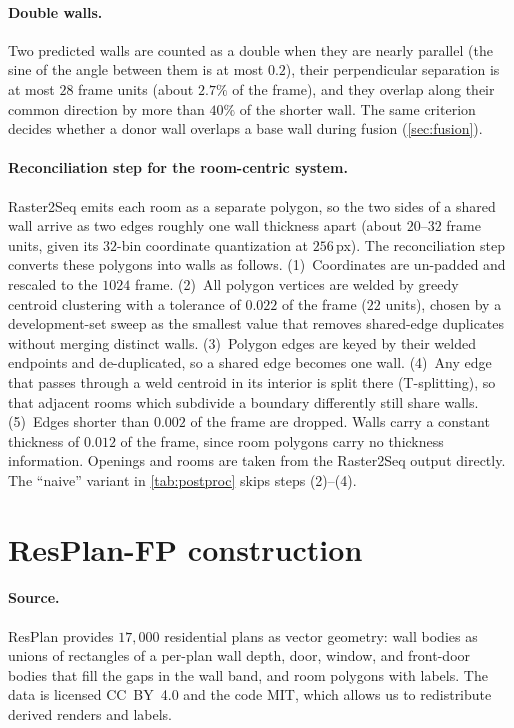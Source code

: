 \documentclass{article}
\begin{document}
\paragraph{Double walls.} Two predicted walls are counted as a double when
they are nearly parallel (the sine of the angle between them is at most
$0.2$), their perpendicular separation is at most $28$ frame units (about
$2.7\%$ of the frame), and they overlap along their common direction by more
than $40\%$ of the shorter wall. The same criterion decides whether a donor
wall overlaps a base wall during fusion (\cref{sec:fusion}).

\paragraph{Reconciliation step for the room-centric system.} Raster2Seq emits
each room as a separate polygon, so the two sides of a shared wall arrive as
two edges roughly one wall thickness apart (about $20$--$32$ frame units,
given its $32$-bin coordinate quantization at $256$\,px). The reconciliation
step converts these polygons into walls as follows. (1)~Coordinates are
un-padded and rescaled to the $1024$ frame. (2)~All polygon vertices are
welded by greedy centroid clustering with a tolerance of $0.022$ of the frame
($22$ units), chosen by a development-set sweep as the smallest
value that removes shared-edge duplicates without merging distinct walls.
(3)~Polygon edges are keyed by their welded endpoints and de-duplicated, so a
shared edge becomes one wall. (4)~Any edge that passes through a weld centroid
in its interior is split there (T-splitting), so that adjacent rooms which
subdivide a boundary differently still share walls. (5)~Edges shorter than
$0.002$ of the frame are dropped. Walls carry a constant thickness of $0.012$
of the frame, since room polygons carry no thickness information. Openings
and rooms are taken from the Raster2Seq output directly. The ``naive'' variant
in \cref{tab:postproc} skips steps (2)--(4).

\section{ResPlan-FP construction}\label{app:resplan}
\paragraph{Source.} ResPlan \citep{resplan2025} provides $17{,}000$
residential plans as vector geometry: wall bodies as unions of rectangles of a
per-plan wall depth, door, window, and front-door bodies that fill the gaps in
the wall band, and room polygons with labels. The data is licensed CC~BY~4.0
and the code MIT, which allows us to redistribute derived renders and labels.
\end{document}
